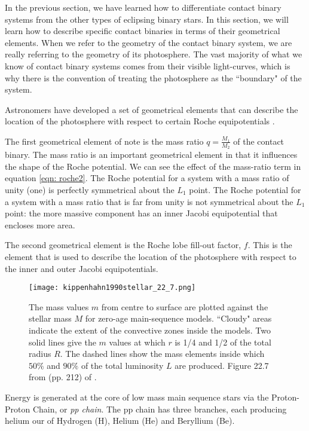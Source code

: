 \documentclass[12pt]{article} %
\numberwithin{equation}{section} %
\begin{document}
In the previous section, we have learned how to differentiate contact binary systems from the other types of eclipsing binary stars. In this section, we will learn how to describe specific contact binaries in terms of their geometrical elements. When we refer to the geometry of the contact binary system, we are really referring to the geometry of its photosphere. The vast majority of what we know of contact binary systems comes from their visible light-curves, which is why there is the convention of treating the photosphere as the ``boundary" of the system.

Astronomers have developed a set of geometrical elements that can describe the location of the photosphere with respect to certain Roche equipotentials . 

The first geometrical element of note is the mass ratio $q = \frac{M_{1}}{M_{2}}$ of the contact binary. The mass ratio is an important geometrical element in that it influences the shape of the Roche potential. We can see the effect of the mass-ratio term in equation \ref{eqn: roche2}. The Roche potential for a system with a mass ratio of unity (one) is perfectly symmetrical about the $L_{1}$ point. The Roche potential for a system with a mass ratio that is far from unity is not symmetrical about the $L_{1}$ point: the more massive component has an inner Jacobi equipotential that encloses more area.

The second geometrical element is the Roche lobe fill-out factor, $f$. This is the element that is used to describe the location of the photosphere with respect to the inner and outer Jacobi equipotentials.



\begin{figure}[H]
\centering
\texttt{[image: kippenhahn1990stellar\_22\_7.png]}
\caption{The mass values $m$ from centre to surface are plotted against the stellar mass $M$ for zero-age main-sequence models. ``Cloudy" areas indicate the extent of the convective zones inside the models. Two solid lines give the $m$ values at which $r$ is 1/4 and 1/2 of the total radius $R$. The dashed lines show the mass elements inside which $50\%$ and $90\%$ of the total luminosity $L$ are produced. Figure 22.7 from (pp. 212) of \citet{kippenhahn1990stellar}.}
\label{fig: kippenhahn1990stellar_22_7}
\end{figure}

Energy is generated at the core of low mass main sequence stars via the Proton-Proton Chain, or \emph{pp chain}. The pp chain has three branches, each producing helium our of Hydrogen (H), Helium (He) and Beryllium (Be). 
\end{document}
